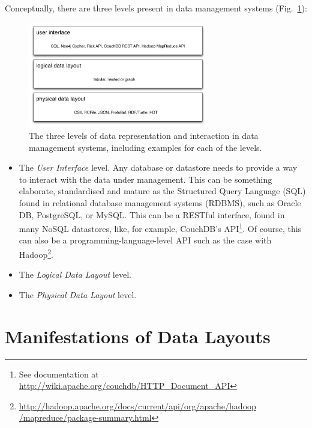 \documentclass{llncs}
\begin{document}
Conceptually, there are three levels present in data management systems
(Fig.~\ref{fig:data-layers}):
\begin{figure}[h!]
\centering
\includegraphics[width=0.7\textwidth]{data-layers}
\caption{The three levels of data representation and interaction in data 
management systems, including examples for each of the levels.}
\label{fig:data-layers}
\end{figure}
\begin{itemize}
\item The \emph{User Interface} level. Any database or datastore needs 
to provide a way to interact with the data under management. This can be 
something elaborate, standardised and mature as the Structured Query Language 
(SQL) found in relational database management systems (RDBMS), such as 
Oracle DB, PostgreSQL, or MySQL. This can be a RESTful interface, found in many 
NoSQL datastores, like, for example, CouchDB's API\footnote{See documentation at
\url{http://wiki.apache.org/couchdb/HTTP_Document_API}}. Of course, this can 
also be a programming-language-level API such as the case with
Hadoop\footnote{\url{http://hadoop.apache.org/docs/current/api/org/apache/hadoop
/mapreduce/package-summary.html}}.
\item The \emph{Logical Data Layout} level.
\item The \emph{Physical Data Layout} level.
\end{itemize}




\section{Manifestations of Data Layouts}
\label{sec:mani}
\end{document}
